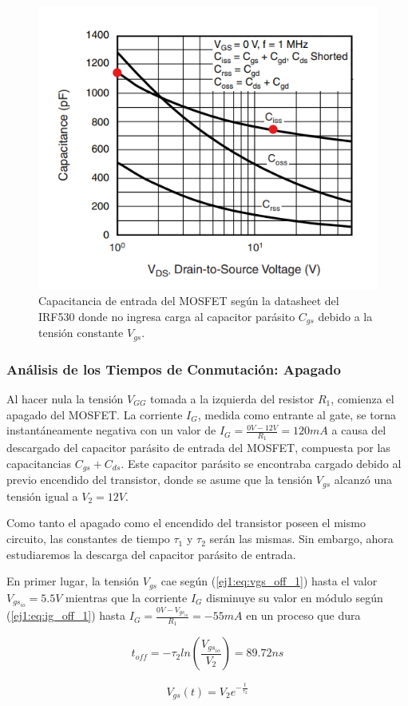 \begin{figure}[H]
	\centering
	\includegraphics[width=0.4\linewidth]{ImagenesEjercicio-1/Vds-C}
	\caption{Capacitancia de entrada del MOSFET según la datasheet del IRF530 donde no ingresa carga al capacitor parásito $C_{gs}$ debido a la tensión constante $V_{gs}$.}
	\label{ej1:fig:cgd}
\end{figure}

\subsubsection{Análisis de los Tiempos de Conmutación: Apagado}

Al hacer nula la tensión $V_{GG}$ tomada a la izquierda del resistor $R_1$, comienza el apagado del MOSFET. La corriente $I_G$, medida como entrante al gate, se torna instantáneamente negativa con un valor de $I_G = \frac{0V-12V}{R_1} = 120mA$ a causa del descargado del capacitor parásito de entrada del MOSFET, compuesta por las capacitancias $C_{gs} + C_{ds}$. Este capacitor parásito se encontraba cargado debido al previo encendido del transistor, donde se asume que la tensión $V_{gs}$ alcanzó una tensión igual a $V_2 = 12V$.

Como tanto el apagado como el encendido del transistor poseen el mismo circuito, las constantes de tiempo $\tau_1$ y $\tau_2$ serán las mismas. Sin embargo, ahora estudiaremos la descarga del capacitor parásito de entrada.

En primer lugar, la tensión $V_{gs}$ cae según (\ref{ej1:eq:vgs_off_1}) hasta el valor $V_{gs_{io}} = 5.5V$ mientras que la corriente $I_G$ disminuye su valor en módulo según (\ref{ej1:eq:ig_off_1}) hasta $I_G = \frac{0V - V_{gs_{io}}}{R_1} = -55mA$ en un proceso que dura

\begin{equation}
t_{off} = -\tau_2 ln(\frac{V_{gs_{io}}}{V_2}) = 89.72ns
\label{ej1:eq:toff}
\end{equation}

\begin{equation}
V_{gs}(t) = V_2e^{-\frac{t}{\tau_2}}
\label{ej1:eq:vgs_off_1}
\end{equation}

